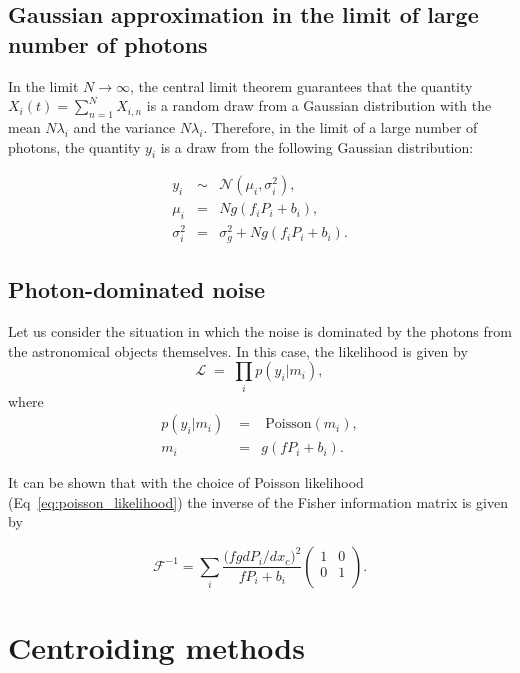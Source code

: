 \documentclass[onecolumn]{aastex61}
\newcommand{\beq}{\begin{equation}}
\newcommand{\eeq}{\end{equation}}
\begin{document}
\subsection{Gaussian approximation in the limit of large number of photons}

In the limit $N \rightarrow \infty$, the central limit theorem guarantees that the quantity $X_{i}(t) = \sum_{n=1}^{N} X_{i,n}$ is a random draw 
from a Gaussian distribution with the mean $N\lambda_i$ and the variance $N\lambda_i$. Therefore, in the limit of a large number of photons, the quantity $y_{i}$ 
is a draw from the following Gaussian distribution:

\begin{eqnarray}
y_{i} &\sim& \mathcal{N}(\mu_i , \sigma_i^2), \\
\mu_i &=& N g (f_iP_i + b_i), \\
\sigma_i^{2} &=& \sigma_{g}^{2} + N g (f_iP_i + b_i).
\end{eqnarray}


\subsection{Photon-dominated noise}

Let us consider the situation in which the noise is dominated by the photons from the astronomical objects themselves. In this case, the likelihood is given by
\beq
\mathcal{L} \; = \; \prod_{i} p(y_{i}|m_i),
\label{eq:poisson_likelihood}
\eeq
where 
\begin{eqnarray}
p(y_i|m_i) \; &=& \; \mathrm{Poisson}(m_i),\\
m_i &=& g(fP_i+b_i).
\end{eqnarray}

It can be shown that with the choice of Poisson likelihood (Eq~\ref{eq:poisson_likelihood}) the inverse of the Fisher information matrix is given by 

\beq
  \mathcal{F}^{-1} = \sum_i \frac{\Big(fgdP_{i}/dx_c\Big)^{2}}{fP_i + b_i} 
  \begin{pmatrix}
      1 & 0\\
      0 & 1\\
  \end{pmatrix}.
\label{crlbmoffat}
\eeq


\section{Centroiding methods}\label{sec:method}
\end{document}
